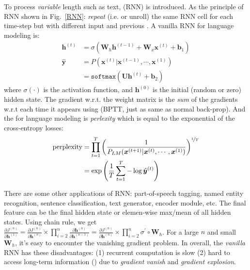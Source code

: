 To process \emph{variable} length  such as text,  (RNN) is introduced.
As the principle of RNN shown in Fig.~\ref{RNN}: \emph{repeat} (i.e.  or unroll) the same RNN cell for each time-step but with different input and previous .
A vanilla RNN for language modeling is:
\begin{align}
\bm{h}^{(t)} &= \sigma \left(\bm{W}_h \bm{h}^{(t-1)} + \bm{W}_x \bm{x}^{(t)} + \bm{b}_1\right) \nonumber \\
\hat{\bm{y}} &= P(\bm{x}^{(t)} | \bm{x}^{(t-1)}, \cdots, \bm{x}^{(1)}) \nonumber \nonumber \\
&= \texttt{softmax}(\bm{U}\bm{h}^{(t)} + \bm{b}_2) \nonumber
\end{align}
where $\sigma(\cdot)$ is the activation function, and $\bm{h}^{(0)}$ is the initial (random or zero) hidden state.
The gradient w.r.t. the weight matrix is the \emph{sum} of the gradients w.r.t each time it appears using  (BPTT, just as same as normal back-prop).
And the  for language modeling is \emph{perlexity} which is equal to the exponential of the cross-entropy losses:
\begin{align}
\text{perplexity} &= \prod_{t=1}^T \left(\frac{1}{P_{LM} (\bm{x}^{(t+1)} | \bm{x}^{(t)}, \cdots, \bm{x}^{(1)})}\right)^{\nicefrac{1}{T}} \nonumber \\
&= \exp\left(\frac{1}{T} \sum_{t=1}^T -\log \hat{\bm{y}}^{(t)}\right)
\end{align}

There are some other applications of RNN: part-of-speech tagging, named entity recognition, sentence classification, text generator, encoder module, etc.
The final feature can be the final hidden state or elemen-wise max/mean of all hidden states.
Using chain rule, we get $\frac{\partial J^{(n)}}{\partial \bm{h}^{(1)}} = \frac{\partial J^{(n)}}{\partial \bm{h}^{(n)}} \times \prod_{i=2}^n \frac{\partial \bm{h}^{(n)}}{\partial \bm{h}^{(n-1)}} = \frac{\partial J^{(n)}}{\partial \bm{h}^{(n)}} \times \prod_{i=2}^n \sigma^\prime \circ \bm{W}_h$.
For a large $n$ and small $\bm{W}_h$, it's easy to encounter the vanishing gradient problem.
In overall, the \emph{vanilla} RNN has these disadvantages: (1) recurrent computation is slow (2) hard to access long-term information () due to \emph{gradient vanish} and \emph{gradient explosion}.

